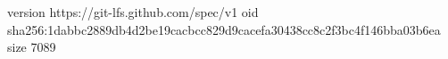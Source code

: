 version https://git-lfs.github.com/spec/v1
oid sha256:1dabbc2889db4d2be19cacbcc829d9cacefa30438cc8c2f3bc4f146bba03b6ea
size 7089
